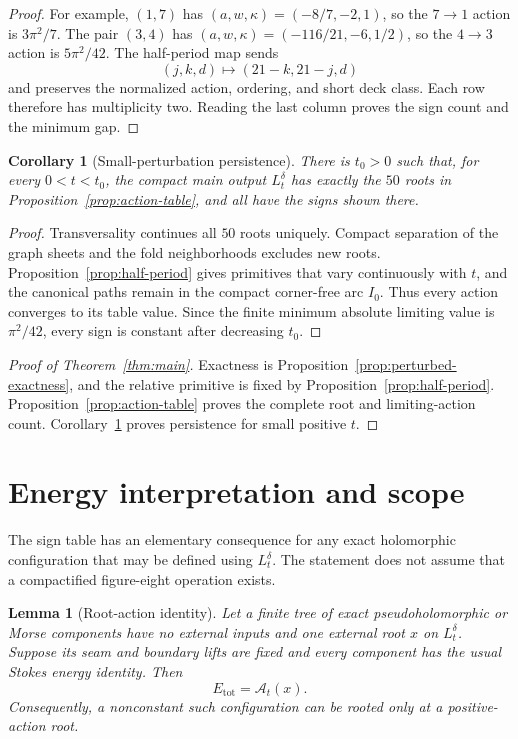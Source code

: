 \documentclass[11pt,reqno]{amsart}
\theoremstyle{plain}
\newtheorem{lemma}[theorem]{Lemma}
\newtheorem{corollary}[theorem]{Corollary}
\theoremstyle{definition}
\begin{document}
\begin{proof}
For example, $(1,7)$ has $(a,w,\kappa)=(-8/7,-2,1)$, so the $7\to1$ action is
$3\pi^2/7$.  The pair $(3,4)$ has
$(a,w,\kappa)=(-116/21,-6,1/2)$, so the $4\to3$ action is $5\pi^2/42$.  The half-period map sends
\[
 (j,k,d)\longmapsto(21-k,21-j,d)
\]
and preserves the normalized action, ordering, and short deck class.  Each row therefore has
multiplicity two.  Reading the last column proves the sign count and the minimum gap.
\end{proof}

\begin{corollary}[Small-perturbation persistence]\label{cor:persistence}
There is $t_0>0$ such that, for every $0<t<t_0$, the compact main output $L_t^\delta$ has exactly the $50$ roots in
Proposition~\ref{prop:action-table}, and all have the signs shown there.
\end{corollary}

\begin{proof}
Transversality continues all $50$ roots uniquely.  Compact separation of the graph sheets and the
fold neighborhoods excludes new roots.  Proposition~\ref{prop:half-period} gives primitives that
vary continuously with $t$, and the canonical paths remain in the compact corner-free arc $I_0$.
Thus every action converges to its table value.  Since the finite minimum absolute limiting value
is $\pi^2/42$, every sign is constant after decreasing $t_0$.
\end{proof}

\begin{proof}[Proof of Theorem~\ref{thm:main}]
Exactness is Proposition~\ref{prop:perturbed-exactness}, and the relative primitive is fixed by
Proposition~\ref{prop:half-period}.  Proposition~\ref{prop:action-table} proves the complete root
and limiting-action count.  Corollary~\ref{cor:persistence} proves persistence for small positive
$t$.
\end{proof}

\section{Energy interpretation and scope}\label{sec:scope}

The sign table has an elementary consequence for any exact holomorphic configuration that may be
defined using $L_t^\delta$.  The statement does not assume that a compactified figure-eight operation
exists.

\begin{lemma}[Root-action identity]\label{lem:energy-action}
Let a finite tree of exact pseudoholomorphic or Morse components have no external inputs and one
external root $x$ on $L_t^\delta$.  Suppose its seam and boundary lifts are fixed and every component has
the usual Stokes energy identity.  Then
\[
 E_{\mathrm{tot}}=\mathcal A_t(x).
\]
Consequently, a nonconstant such configuration can be rooted only at a positive-action root.
\end{lemma}
\end{document}
